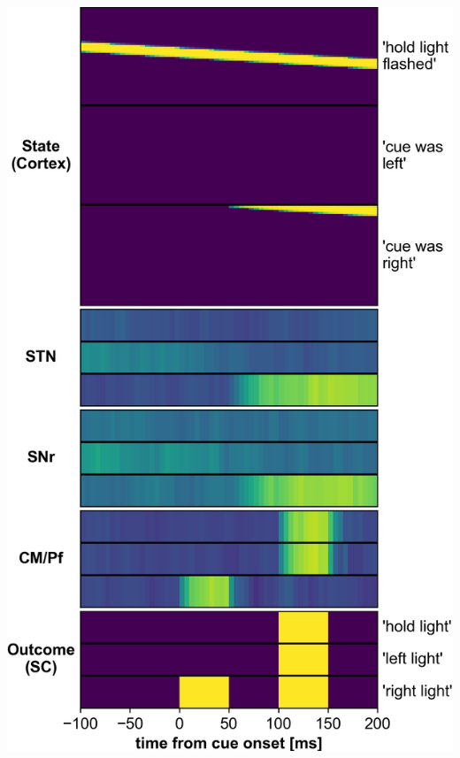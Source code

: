 \documentclass[portrait,final,a0paper,fontscale=0.30]{baposter}
\begin{document}
\begin{poster}
{\begin{adjustbox}{minipage=\textwidth, margin=2pt, center}
    \centering
	\begin{minipage}{0.26\textwidth}
		\centering
        \includegraphics[width=\linewidth]{figures/single_trial_rates_cor_and_responses_matrix.png}
        

\end{minipage}
\end{adjustbox}}
\end{poster}
\end{document}
